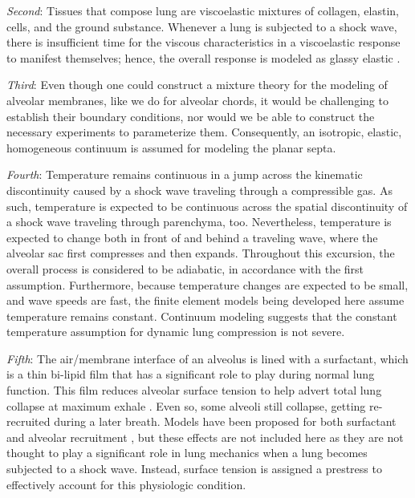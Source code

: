 \textit{Second\/}: Tissues that compose lung are visco\-elastic \cite{Hildebrandt69,HoppinHildebrandt77} mixtures of collagen, elastin, cells, and the ground substance. \cite{RoanWaters11,Sukietal11}  Whenever a lung is subjected to a shock wave, there is insufficient time for the viscous characteristics in a visco\-elastic response to manifest themselves; hence, the overall response is modeled as glassy elastic \cite{ClaytonFreed20,Clayton2019TRL,Clayton2019AIP}.  

\textit{Third\/}: Even though one could construct a mixture theory for the modeling of alveolar membranes, like we do for alveolar chords, it would be challenging to establish their boundary conditions, nor would we be able to construct the necessary experiments to parameterize them.  Consequently, an isotropic, elastic, homogeneous continuum is assumed for modeling the planar septa.

\textit{Fourth\/}: Temperature remains continuous in a jump across the kinematic discontinuity caused by a shock wave traveling through a compressible gas. \cite{AmesStaff53} As such, temperature is expected to be continuous across the spatial discontinuity of a shock wave traveling through parenchyma, too.  Nevertheless, temperature is expected to change both in front of and behind a traveling wave, where the alveolar sac first compresses and then expands.  Throughout this excursion, the overall process is considered to be adiabatic, in accordance with the first assumption.  Furthermore, because temperature changes are expected to be small, and wave speeds are fast, the finite element models being developed here assume temperature remains constant.  Continuum modeling  \cite{ClaytonFreed20,Clayton2019TRL,Clayton2019AIP} suggests that the constant temperature assumption for dynamic lung compression is not severe.

\textit{Fifth\/}: The air\slash membrane interface of an alveolus is lined with a surfactant, which is a thin bi-lipid film that has a significant role to play during normal lung function.  This film reduces alveolar surface tension to help advert total lung collapse at maximum exhale \cite{Stamenovic90}.  Even so, some alveoli still collapse, getting re-recruited during a later breath.  Models have been proposed for both surfactant \cite{Hills99} and alveolar recruitment \cite{Bates07}, but these effects are not included here as they are not thought to play a significant role in lung mechanics when a lung becomes subjected to a shock wave.  Instead, surface tension is assigned a prestress to effectively account for this physiologic condition.

